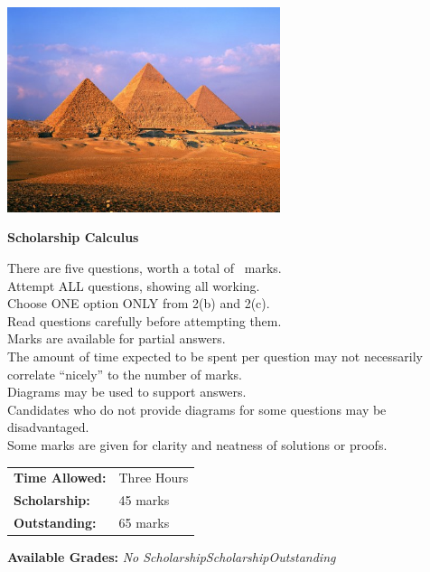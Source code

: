 \documentclass[a4paper,addpoints]{exam}
\begin{document}
\begin{coverpages}

\begin{center}
  \includegraphics[width=0.6\textwidth]{exam-cover-07}

  \vspace{5mm}

  \textbf{\Huge{Scholarship Calculus}}

\end{center}

\vspace{5mm}

\noindent
\large{There are five questions, worth a total of \numpoints\ marks.\\
       Attempt ALL questions, showing all working.\\
       Choose ONE option ONLY from 2(b) and 2(c).\\
       Read questions carefully before attempting them.\\
       Marks are available for partial answers.\\
       The amount of time expected to be spent per question may not necessarily correlate ``nicely'' to the number of marks.\\
       Diagrams may be used to support answers.\\
       Candidates who do not provide diagrams for some questions may be disadvantaged.\\
       Some marks are given for clarity and neatness of solutions or proofs.}
\vspace{2mm}

\begin{tabular}{ll}
  \textbf{Time Allowed:}& Three Hours\\
  \textbf{Scholarship:}& 45 marks\\
  \textbf{Outstanding:}& 65 marks
\end{tabular}

\vfill

\begin{center}
  \gradetable[h][questions]
  \vspace{5mm}

  \textbf{Available Grades:} \quad\textit{No Scholarship}\qquad\textit{Scholarship}\qquad\textit{Outstanding}
\end{center}

\end{coverpages}
\end{document}

